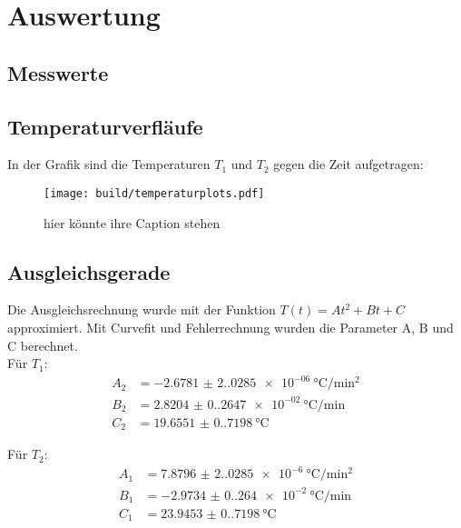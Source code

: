 \section{Auswertung}
\label{sec:Auswertung}

\subsection{Messwerte}
\begin{center}
\end{center}

\subsection{Temperaturverfläufe}
In der Grafik sind die Temperaturen $T_1$ und $T_2$ gegen die Zeit aufgetragen:
\begin{figure}[H]
  \centering
  \texttt{[image: build/temperaturplots.pdf]}
  \caption{hier könnte ihre Caption stehen}
\end{figure}

\subsection{Ausgleichsgerade}
Die Ausgleichsrechnung wurde mit der Funktion $T(t) = A t^2 + B t + C$ approximiert. Mit Curvefit und Fehlerrechnung 
wurden die Parameter A, B und C berechnet.\\
Für $T_1$:
\begin{align*}%
  A_2 &= \SI{-2.6781(2.0285)e-06}{\degreeCelsius\per\square\minute}\\
  B_2 &= \SI{2.8204(0.2647)e-02}{\degreeCelsius\per\minute}\\
  C_2 &= \SI{19.6551(0.7198)}{\degreeCelsius}
\end{align*}

Für $T_2$:
\begin{align*}
  A_1 &= \SI{7.8796(2.0285)e-6}{\degreeCelsius\per\square\minute}\\
  B_1 &= \SI{-2.9734(0.264)e-2}{\degreeCelsius\per\minute}\\
  C_1 &= \SI{23.9453(0.7198)}{\degreeCelsius}
\end{align*}

